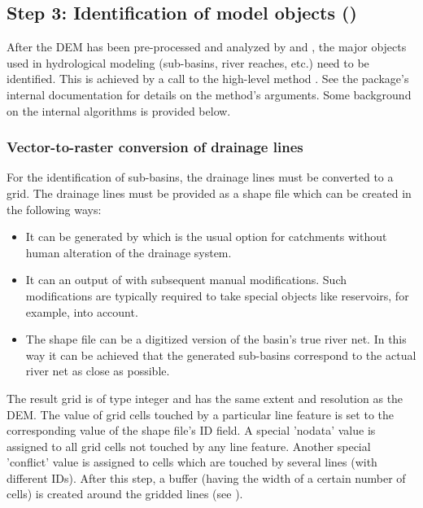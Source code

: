 \subsection{Step 3: Identification of model objects ()}
After the DEM has been pre-processed and analyzed by  and , the major objects used in hydrological modeling (sub-basins, river reaches, etc.) need to be identified. This is achieved by a call to the high-level method . See the package's internal documentation for details on the method's arguments. Some background on the internal algorithms is provided below.

\subsubsection*{Vector-to-raster conversion of drainage lines}
For the identification of sub-basins, the drainage lines must be converted to a grid. 
The drainage lines must be provided as a shape file which can be created in the following ways:
\begin{itemize}
  \item It can be generated by  which is the usual option for catchments without human alteration of the drainage system.
  \item It can an output of  with subsequent manual modifications. Such modifications are typically required to take special objects like reservoirs, for example, into account.
  \item The shape file can be a digitized version of the basin's true river net. In this way it can be achieved that the generated sub-basins correspond to the actual river net as close as possible.
\end{itemize}

The result grid is of type integer and has the same extent and resolution as the DEM. The value of grid cells touched by a particular line feature is set to the corresponding value of the shape file's ID field. A special 'nodata' value is assigned to all grid cells not touched by any line feature. Another special 'conflict' value is assigned to cells which are touched by several lines (with different IDs). After this step, a buffer (having the width of a certain number of cells) is created around the gridded lines (see ).

